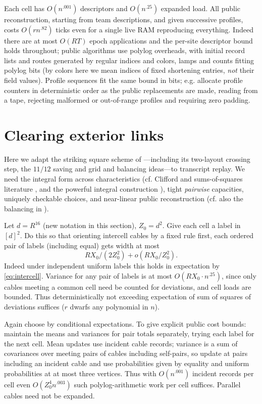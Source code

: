 \documentclass[11pt,letterpaper]{article}
\theoremstyle{definition}
\numberwithin{equation}{section}
\begin{document}
Each cell has $O(n^{.001})$ descriptors and $O(n^{.25})$ expanded load. All public reconstruction,
starting from team descriptions, and given successive profiles, costs $O(rn^{.82})$ ticks even for a
single live RAM reproducing everything. Indeed there are at most $O(RT)$ epoch applications
and the per-site descriptor bound holds throughout; public algorithms use polylog overheads,
with initial record lists and routes generated by regular indices and colors, lamps and counts
fitting polylog bits (by colors here we mean indices of fixed shortening entries, \emph{not} their
field values). Profile sequences fit the same bound in bits; e.g. allocate profile counters in
deterministic order as the public replacements are made, reading from a tape, rejecting
malformed or out-of-range profiles and requiring zero padding.

\section{Clearing exterior links}\label{sec:exterior}

Here we adapt the striking square scheme of \cite[\S2]{Anthropic3SAT}---including its two-layout crossing
step, the $11/12$ saving and grid and balancing ideas---to transcript replay. We need the
integral form across characteristics (cf. Clifford and sums-of-squares literature \cite{HWY,Hrubes}, and
the powerful integral construction \cite{Khoruzhii}), tight \emph{pairwise} capacities, uniquely checkable choices,
and near-linear public reconstruction (cf. also the balancing in \cite{ETHfalse}).

Let $d=R^{16}$ (new notation in this section), $Z_0=d^2$. Give each cell a label in $[d]^2$.
Do this so that orienting intercell cables by a fixed rule first, each ordered pair of labels
(including equal) gets width at most
\[
  RX_0/(2Z_0^2) + o(RX_0/Z_0^2).
\]
Indeed under independent uniform labels this holds in expectation by \eqref{eq:intercell}. Variance for
any pair of labels is at most $O(RX_0 \cdot n^{.25})$, since only cables meeting a common cell need be
counted for deviations, and cell loads are bounded. Thus deterministically not exceeding
expectation of sum of squares of deviations suffices ($r$ dwarfs any polynomial in $n$).

Again choose by conditional expectations. To give explicit public cost bounds: maintain
the means and variances for pair totals separately, trying each label for the next cell. Mean
updates use incident cable records; variance is a sum of covariances over meeting pairs of
cables including self-pairs, so update at pairs including an incident cable and use probabilities
given by equality and uniform probabilities at at most three vertices. Thus with $O(n^{.001})$
incident records per cell even $O(Z_0^4 n^{.003})$ such polylog-arithmetic work per cell suffices.
Parallel cables need not be expanded.
\end{document}
